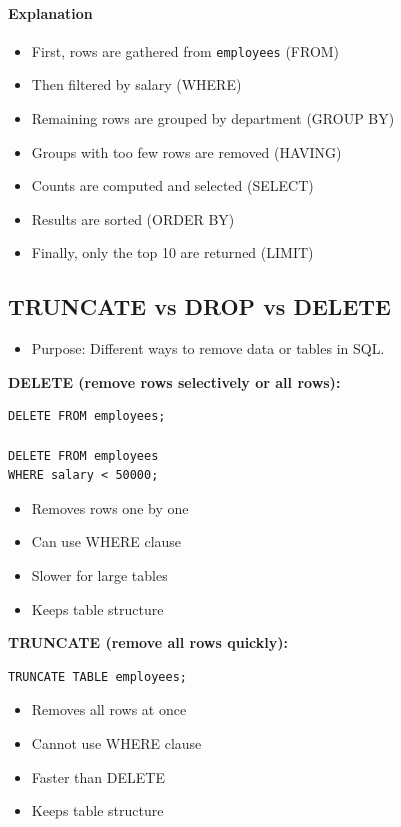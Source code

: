 \documentclass[10pt]{article}
\begin{document}
\paragraph{Explanation}
\begin{itemize}
\item First, rows are gathered from \texttt{employees} (FROM)
\item Then filtered by salary (WHERE)
\item Remaining rows are grouped by department (GROUP BY)
\item Groups with too few rows are removed (HAVING)
\item Counts are computed and selected (SELECT)
\item Results are sorted (ORDER BY)
\item Finally, only the top 10 are returned (LIMIT)
\end{itemize}

\newpage

\subsection{TRUNCATE vs DROP vs DELETE}
\begin{itemize}
    \item Purpose: Different ways to remove data or tables in SQL.
\end{itemize}

\textbf{DELETE (remove rows selectively or all rows):}

\begin{verbatim}
DELETE FROM employees;

DELETE FROM employees
WHERE salary < 50000;
\end{verbatim}

\begin{itemize}
    \item Removes rows one by one
    \item Can use WHERE clause
    \item Slower for large tables
    \item Keeps table structure
\end{itemize}

\textbf{TRUNCATE (remove all rows quickly):}

\begin{verbatim}
TRUNCATE TABLE employees;
\end{verbatim}

\begin{itemize}
    \item Removes all rows at once
    \item Cannot use WHERE clause
    \item Faster than DELETE
    \item Keeps table structure
\end{itemize}
\end{document}
